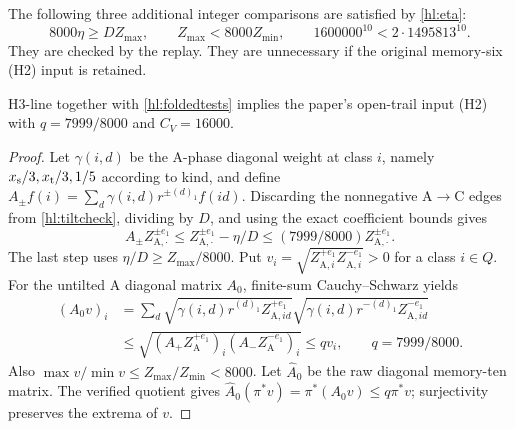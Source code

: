 The following three additional integer comparisons are satisfied
by \eqref{hl:eta}:
\begin{equation}\label{hl:foldedtests}
 8000\eta\ge D Z_{\max},\qquad
 Z_{\max}<8000 Z_{\min},\qquad
 1600000^{10}<2\cdot1495813^{10}.
\end{equation}
They are checked by the replay.  They are unnecessary if the
original memory-six (H2) input is retained.

\begin{proposition}\label{hl:H2}
H3-line together with \eqref{hl:foldedtests} implies the paper's
open-trail input (H2) with $q=7999/8000$ and $C_V=16000$.
\end{proposition}

\begin{proof}
Let $\gamma(i,d)$ be the A-phase diagonal weight at class $i$, namely
$x_{\rm s}/3,x_{\rm t}/3,1/5$ according to kind, and define
$A_\pm f(i)=\sum_d\gamma(i,d)r^{\pm(d)_1}f(id)$.
Discarding the nonnegative A$\to$C edges from
\eqref{hl:tiltcheck}, dividing by $D$, and using the exact
coefficient bounds gives
\[
 A_\pm Z^{\pm e_1}_{\mathrm A,\cdot}
 \le Z^{\pm e_1}_{\mathrm A,\cdot}-\eta/D
 \le (7999/8000)Z^{\pm e_1}_{\mathrm A,\cdot}.
\]
The last step uses $\eta/D\ge Z_{\max}/8000$.
Put $v_i=\sqrt{Z^{+e_1}_{\mathrm A,i}Z^{-e_1}_{\mathrm A,i}}>0$
for a class $i\in Q$.  For the untilted A diagonal matrix
$A_0$, finite-sum Cauchy--Schwarz yields
\[
\begin{split}
 (A_0v)_i
 &=\sum_d\sqrt{\gamma(i,d)r^{(d)_1}Z^{+e_1}_{\mathrm A,id}}
             \sqrt{\gamma(i,d)r^{-(d)_1}Z^{-e_1}_{\mathrm A,id}}\\
 &\le\sqrt{(A_+Z^{+e_1}_{\mathrm A})_i
                 (A_-Z^{-e_1}_{\mathrm A})_i}
 \le qv_i,\qquad q=7999/8000.
\end{split}
\]
Also $\max v/\min v\le Z_{\max}/Z_{\min}<8000$.
Let $\widehat A_0$ be the raw diagonal memory-ten matrix.
The verified quotient gives
$\widehat A_0(\pi^*v)=\pi^*(A_0v)\le q\pi^*v$;
surjectivity preserves the extrema of $v$.


\end{proof}
